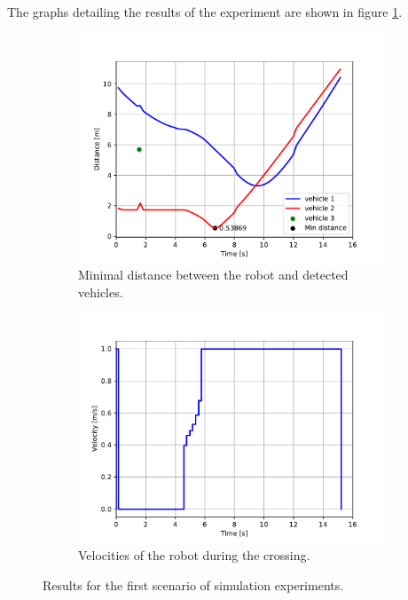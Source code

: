             The graphs detailing the results of the experiment are shown in figure \ref{fig:scene1_graphs}.
            \begin{figure}[H]
                \centering
                \begin{subfigure}{0.49\linewidth}
                    \centering
                    \includegraphics[trim={24 8 40 41}, clip, width=\linewidth]{images/simulations/scene1_dist.pdf}
                    \caption{Minimal distance between the robot and detected vehicles.}
                \end{subfigure}
                \begin{subfigure}{0.49\linewidth}
                    \centering
                    \includegraphics[trim={21 8 40 41}, clip, width=\linewidth]{images/simulations/scene1_vel.pdf}
                    \caption{Velocities of the robot during the crossing.}
                \end{subfigure}
                \caption{Results for the first scenario of simulation experiments.}
                \label{fig:scene1_graphs}
            \end{figure}
